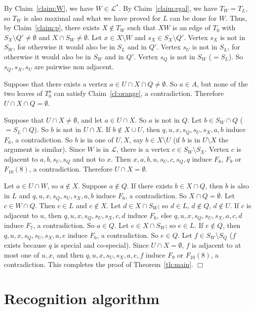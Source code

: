 \documentclass[11pt]{article}
\begin{document}
By Claim~\ref{claim:W}, we have $W\in \mathcal L^*$.  By
Claim~\ref{claim:egal}, we have $T_W=T_L$, so $T_W$ is also maximal
and what we have proved for $L$ can be done for $W$.  Thus, by
Claim~\ref{claim:p}, there exists $X\notin T_W$ such that $XW$ is an
edge of $T_0$ with $S_X\setminus Q'\neq \emptyset$ and $X\cap S_W \neq
\emptyset$.  Let $x\in X\setminus W$ and $s_X\in S_X\setminus Q'$.
Vertex $s_X$ is not in $S_W$, for otherwise it would also be in $S_L$
and in $Q'$.  Vertex $s_U$ is not in $S_L$, for otherwise it would
also be in $S_W$ and in $Q'$.  Vertex $s_Q$ is not in $S_W$ ($=S_L$).
So $s_Q, s_X, s_U$ are pairwise non adjacent.

Suppose that there exists a vertex $a\in U\cap X\cap Q\neq \emptyset$.
So $a\in A$, but none of the two leaves of $T_0^a$ can satisfy
Claim~\ref{cl:orange}, a contradiction.  Therefore $U\cap X\cap Q=
\emptyset$.

Suppose that $U\cap X\neq \emptyset$, and let $a\in U\cap X$.  So $a$
is not in $Q$.  Let $b\in S_W\cap Q$ ($=S_L\cap Q$).  So $b$ is not in
$U\cap X$.  If $b\notin X\cup U$, then $q, u, x, s_Q, s_U, s_X, a, b$
induce $F_6$, a contradiction.  So $b$ is in one of $U, X$, say $b\in
X \setminus U$ (if $b$ is in $U\setminus X$ the argument is similar).
Since $W$ is in $\mathcal L$, there is a vertex $c\in S_W \setminus
S_X$.  Vertex $c$ is adjacent to $a, b, s_U, s_Q$ and not to $x$.
Then $x, a, b, u, s_U, c, s_Q, q$ induce $F_8$, $F_9$ or $F_{10}(8)$,
a contradiction.  Therefore $U\cap X= \emptyset$.

Let $a\in U\cap W$, so $a\notin X$.  Suppose $a\notin Q$.  If there
exists $b\in X\cap Q$, then $b$ is also in $L$ and $q, u, x, s_Q, s_U,
s_X, a, b$ induce $F_6$, a contradiction.  So $X\cap Q=\emptyset$.
Let $c\in W\cap Q$.  Then $c\in L$ and $c\notin X$.  Let $d \in X\cap
S_W$; so $d\in L$, $d\notin Q$, $d\notin U$.  If $c$ is adjacent to
$u$, then $q, u, x, s_Q, s_U, s_X, c, d$ induce $F_6$, else $q, u, x,
s_Q, s_U, s_X, a, c, d$ induce $F_7$, a contradiction.  So $a\in Q$.
Let $e\in X\cap S_W$; so $e\in L$.  If $e\notin Q$, then $q, u, x,
s_Q, s_U, s_X, a, e$ induce $F_6$, a contradiction.  So $e\in Q$.  Let
$f\in S_W\setminus S_Q$ ($f$ exists because $q$ is special and
co-special).  Since $U\cap X=\emptyset$, $f$ is adjacent to at most
one of $u,x$, and then $q, u, x, s_U, s_X, a, e, f$ induce $F_9$ or
$F_{10}(8)$, a contradiction.  This completes the proof of
Theorem~\ref{th:main}.  \hfill $\Box$



\section{Recognition algorithm}
\end{document}
